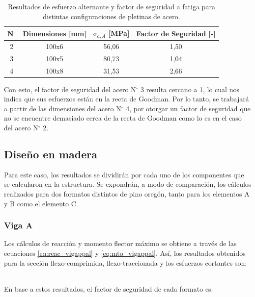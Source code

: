 \begin{table}[h]
\centering
\caption{Resultados de esfuerzo alternante y factor de seguridad a fatiga para distintas configuraciones de pletinas de acero.}
\begin{tabular}{@{}cccc@{}}
\toprule
N$^{\circ}$ & Dimensiones [mm] & $\sigma_{a,A}$ [MPa] & Factor de Seguridad [-] \\ \midrule
2 & 100x6 & 56,06 & 1,50 \\
3 & 100x5 & 80,73 & 1,04 \\
4 & 100x8 & 31,53 & 2,66 \\ \bottomrule
\end{tabular}
\label{tab:itfat_acero}
\end{table}

Con esto, el factor de seguridad del acero N$^{\circ}$ 3 resulta cercano a 1, lo cual nos indica que sus esfuerzos están en la recta de Goodman. Por lo tanto, se trabajará a partir de las dimensiones del acero N$^{\circ}$ 4, por otorgar un factor de seguridad que no se encuentre demasiado cerca de la recta de Goodman como lo es en el caso del acero N$^{\circ}$ 2. 

\subsection{Diseño en madera}
Para este caso, los resultados se dividirán por cada uno de los componentes que se calcularon en la estructura. Se expondrán, a modo de comparación, los cálculos realizados para dos formatos distintos de pino oregón, tanto para los elementos A y B como el elemento C.

\subsubsection{Viga A} Los cálculos de reacción y momento flector máximo se obtiene a través de las ecuaciones \ref{eq:reac_vigappal} y \ref{eq:mto_vigappal}. Así, los resultados obtenidos para la sección flexo-comprimida, flexo-traccionada y los esfuerzos cortantes son:
\begin{table}[h]
\centering
\caption{Resultados obtenidos para la flexión y cizalle de la viga A.}
\label{tab:res_viga_a1}
\end{table}
\\
En base a estos resultados, el factor de seguridad de cada formato es:

